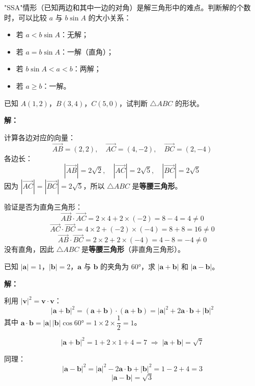 \documentclass[12pt, a4paper]{ctexart}
\begin{document}
\begin{tipbox}[方法总结]
"SSA"情形（已知两边和其中一边的对角）是解三角形中的难点。判断解的个数时，可以比较 $a$ 与 $b\sin A$ 的大小关系：
\begin{itemize}[leftmargin=2em]
  \item 若 $a<b\sin A$：无解；
  \item 若 $a=b\sin A$：一解（直角）；
  \item 若 $b\sin A<a<b$：两解；
  \item 若 $a\geqslant b$：一解。
\end{itemize}
\end{tipbox}

\begin{examplebox}[【例题7】向量在几何中的应用]
已知 $A(1,2)$，$B(3,4)$，$C(5,0)$，试判断 $\triangle ABC$ 的形状。

\textbf{解：}

计算各边对应的向量：
\[
\overrightarrow{AB}=(2,2),\quad \overrightarrow{AC}=(4,-2),\quad \overrightarrow{BC}=(2,-4)
\]
各边长：
\[
|\overrightarrow{AB}|=2\sqrt{2},\quad |\overrightarrow{AC}|=2\sqrt{5},\quad |\overrightarrow{BC}|=2\sqrt{5}
\]
因为 $|\overrightarrow{AC}|=|\overrightarrow{BC}|=2\sqrt{5}$，所以 $\triangle ABC$ 是\textbf{等腰三角形}。

验证是否为直角三角形：
\[
\overrightarrow{AB}\cdot\overrightarrow{AC}=2\times4+2\times(-2)=8-4=4\neq0
\]
\[
\overrightarrow{AC}\cdot\overrightarrow{BC}=4\times2+(-2)\times(-4)=8+8=16\neq0
\]
\[
\overrightarrow{AB}\cdot\overrightarrow{BC}=2\times2+2\times(-4)=4-8=-4\neq0
\]
没有直角，因此 $\triangle ABC$ 是\textbf{等腰三角形}（非直角三角形）。
\end{examplebox}

\begin{examplebox}
已知 $|\boldsymbol{a}|=1$，$|\boldsymbol{b}|=2$，$\boldsymbol{a}$ 与 $\boldsymbol{b}$ 的夹角为 $60°$，求 $|\boldsymbol{a}+\boldsymbol{b}|$ 和 $|\boldsymbol{a}-\boldsymbol{b}|$。

\textbf{解：}

利用 $|\boldsymbol{v}|^2=\boldsymbol{v}\cdot\boldsymbol{v}$：
\[
|\boldsymbol{a}+\boldsymbol{b}|^2=(\boldsymbol{a}+\boldsymbol{b})\cdot(\boldsymbol{a}+\boldsymbol{b})=|\boldsymbol{a}|^2+2\boldsymbol{a}\cdot\boldsymbol{b}+|\boldsymbol{b}|^2
\]
其中 $\boldsymbol{a}\cdot\boldsymbol{b}=|\boldsymbol{a}|\,|\boldsymbol{b}|\cos60°=1\times2\times\dfrac{1}{2}=1$。

\[
|\boldsymbol{a}+\boldsymbol{b}|^2=1+2\times1+4=7 \;\Longrightarrow\; |\boldsymbol{a}+\boldsymbol{b}|=\sqrt{7}
\]

同理：
\[
|\boldsymbol{a}-\boldsymbol{b}|^2=|\boldsymbol{a}|^2-2\boldsymbol{a}\cdot\boldsymbol{b}+|\boldsymbol{b}|^2=1-2+4=3
\]
\[
|\boldsymbol{a}-\boldsymbol{b}|=\sqrt{3}
\]
\end{examplebox}
\end{document}
